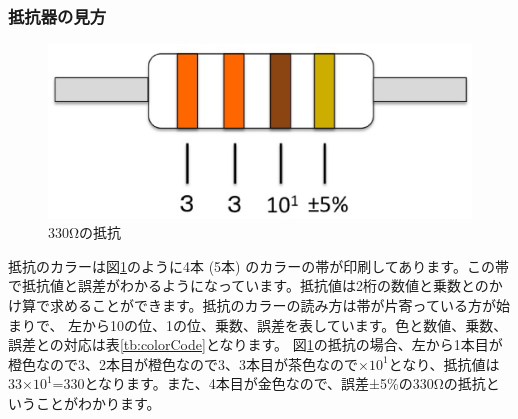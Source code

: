 \documentclass[11pt,a4paper]{jarticle}
\begin{document}
%

\subsubsection*{抵抗器の見方}

\begin{figure}[htb]
  \centering
  \includegraphics[width=0.5\columnwidth]{resistance.eps}
  \caption{330Ωの抵抗}
  \label{figure:resistance}
\end{figure}

抵抗のカラーは図\ref{figure:resistance}のように4本 (5本) のカラーの帯が印刷してあります。この帯で抵抗値と誤差がわかるようになっています。抵抗値は2桁の数値と乗数とのかけ算で求めることができます。抵抗のカラーの読み方は帯が片寄っている方が始まりで、
左から10の位、1の位、乗数、誤差を表しています。色と数値、乗数、誤差との対応は表\ref{tb:colorCode}となります。
図\ref{figure:resistance}の抵抗の場合、左から1本目が橙色なので3、2本目が橙色なので3、3本目が茶色なので$×10^1$となり、抵抗値は33×$10^1$=330となります。また、4本目が金色なので、誤差±5\%の330Ωの抵抗ということがわかります。
\end{document}
